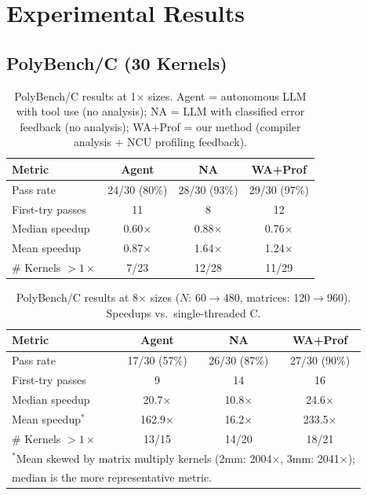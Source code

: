\section{Experimental Results}
\label{sec:eval}

\subsection{PolyBench/C (30 Kernels)}

\begin{table}[t]
  \caption{PolyBench/C results at 1$\times$ sizes. Agent = autonomous LLM with tool use (no analysis); NA = LLM with classified error feedback (no analysis); WA+Prof = our method (compiler analysis + NCU profiling feedback).}
  \label{tab:results_1x}
  \centering\small
  \begin{tabular}{lccc}
    \toprule
    \textbf{Metric} & \textbf{Agent} & \textbf{NA} & \textbf{WA+Prof} \\
    \midrule
    Pass rate          & 24/30 (80\%) & 28/30 (93\%) & 29/30 (97\%) \\
    First-try passes   & 11           & 8            & 12           \\
    Median speedup     & 0.60$\times$ & 0.88$\times$ & 0.76$\times$ \\
    Mean speedup       & 0.87$\times$ & 1.64$\times$ & 1.24$\times$ \\
    \# Kernels $>1\times$ & 7/23         & 12/28        & 11/29        \\
    \bottomrule
  \end{tabular}
\end{table}

\begin{table}[t]
  \caption{PolyBench/C results at 8$\times$ sizes ($N$: 60$\to$480, matrices: 120$\to$960). Speedups vs.\ single-threaded C.}
  \label{tab:results_8x}
  \centering\small
  \begin{tabular}{lccc}
    \toprule
    \textbf{Metric} & \textbf{Agent} & \textbf{NA} & \textbf{WA+Prof} \\
    \midrule
    Pass rate          & 17/30 (57\%) & 26/30 (87\%) & 27/30 (90\%) \\
    First-try passes   & 9            & 14           & 16           \\
    Median speedup     & 20.7$\times$ & 10.8$\times$ & 24.6$\times$ \\
    Mean speedup$^*$   & 162.9$\times$ & 16.2$\times$ & 233.5$\times$ \\
    \# Kernels $>1\times$ & 13/15        & 14/20        & 18/21        \\
    \bottomrule
    \multicolumn{4}{l}{\scriptsize $^*$Mean skewed by matrix multiply kernels (2mm: 2004$\times$, 3mm: 2041$\times$);} \\
    \multicolumn{4}{l}{\scriptsize median is the more representative metric.}
  \end{tabular}
\end{table}

